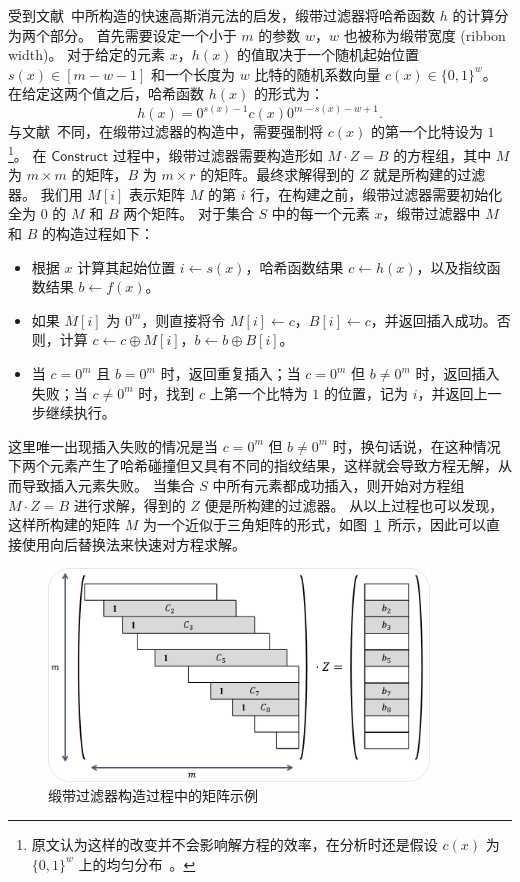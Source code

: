 受到文献~\cite{dietzfelbinger2019Efficient}中所构造的快速高斯消元法的启发，缎带过滤器将哈希函数 $h$ 的计算分为两个部分。
首先需要设定一个小于 $m$ 的参数 $w$，$w$ 也被称为缎带宽度 (ribbon width)。
对于给定的元素 $x$，$h(x)$ 的值取决于一个随机起始位置 $s(x)\in [m-w-1]$ 和一个长度为 $w$ 比特的随机系数向量 $c(x) \in \{0,1\}^w$。
在给定这两个值之后，哈希函数 $h(x)$ 的形式为：
\begin{equation}
  h(x) = 0^{s(x)-1}c(x)0^{m-s(x)-w+1}.
\end{equation}
与文献~\cite{dietzfelbinger2019Efficient}不同，在缎带过滤器的构造中，需要强制将 $c(x)$ 的第一个比特设为 $1$\footnote{原文认为这样的改变并不会影响解方程的效率，在分析时还是假设 $c(x)$ 为 $\{0,1\}^w$ 上的均匀分布~\cite{dillinger2021ribbon}。}。
在 $\mathsf{Construct}$ 过程中，缎带过滤器需要构造形如 $M \cdot Z = B$ 的方程组，其中 $M$ 为 $m\times m$ 的矩阵，$B$ 为 $m\times r$ 的矩阵。最终求解得到的 $Z$ 就是所构建的过滤器。
我们用 $M[i]$ 表示矩阵 $M$ 的第 $i$ 行，在构建之前，缎带过滤器需要初始化全为 $0$ 的 $M$ 和 $B$ 两个矩阵。
对于集合 $S$ 中的每一个元素 $x$，缎带过滤器中 $M$ 和 $B$ 的构造过程如下：
\begin{itemize}
  \item 根据 $x$ 计算其起始位置 $i\gets s(x)$，哈希函数结果 $c \gets h(x)$，以及指纹函数结果 $b \gets f(x)$。
  \item 如果 $M[i]$ 为 $0^{m}$，则直接将令 $M[i] \gets c$，$B[i] \gets c$，并返回插入成功。否则，计算 $c \gets c \oplus M[i]$，$b \gets b \oplus B[i]$。
  \item 当 $c=0^{m}$ 且 $b = 0^{m}$ 时，返回重复插入；当 $c=0^{m}$ 但 $b \neq 0^{m}$ 时，返回插入失败；当 $c\neq 0^{m}$ 时，找到 $c$ 上第一个比特为 $1$ 的位置，记为 $i$，并返回上一步继续执行。
\end{itemize}
这里唯一出现插入失败的情况是当 $c=0^{m}$ 但 $b\neq 0^{m}$ 时，换句话说，在这种情况下两个元素产生了哈希碰撞但又具有不同的指纹结果，这样就会导致方程无解，从而导致插入元素失败。
当集合 $S$ 中所有元素都成功插入，则开始对方程组 $M \cdot Z = B$ 进行求解，得到的 $Z$ 便是所构建的过滤器。
从以上过程也可以发现，这样所构建的矩阵 $M$ 为一个近似于三角矩阵的形式，如图~\ref{fig:ribbon_construc}~所示，因此可以直接使用向后替换法来快速对方程求解。

\begin{figure}[ht]
  \centering
  \includegraphics[width=0.9\textwidth]{figures/ribbon_exp.pdf}
  \caption{缎带过滤器构造过程中的矩阵示例}
  \label{fig:ribbon_construc}
\end{figure}

